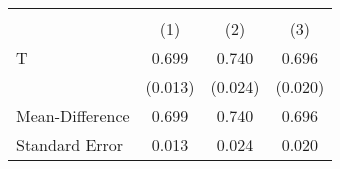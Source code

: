 \begin{tabular}{l*{3}{c}}
\hline\hline
                    &\multicolumn{3}{c}{}                  \\
                    &\multicolumn{1}{c}{(1)}&\multicolumn{1}{c}{(2)}&\multicolumn{1}{c}{(3)}\\
\hline
T                   &       0.699&       0.740&       0.696\\
                    &     (0.013)&     (0.024)&     (0.020)\\
\hline
Mean-Difference     &       0.699&       0.740&       0.696\\
Standard Error      &       0.013&       0.024&       0.020\\
\hline\hline
\end{tabular}
